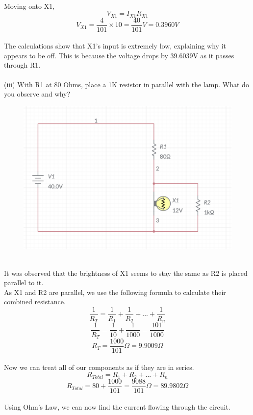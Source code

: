 \documentclass[12pt]{article}
\begin{document}
\\
Moving onto X1,\\
\[V_{X1} = I_{X1}R_{X1}\]
\[V_{X1} = \frac{4}{101} \times 10 = \frac{40}{101}V = 0.3960V\]\\
The calculations show that X1's input is extremely low, explaining why it appears to be off. This is because the voltage drops by 39.6039V as it passes through R1.\\
\\
(iii) With R1 at 80 Ohms, place a 1K resistor in parallel with the lamp. What do you observe and why?\\
\newpage
\begin{figure}[!h] 
	\begin{centering}
		\includegraphics[keepaspectratio = true, width = 5in]{Q2(iii).png}
	\end{centering}
\end{figure}\\
\noindent It was observed that the brightness of X1 seems to stay the same as R2 is placed parallel to it.
\\
As X1 and R2 are parallel, we use the following formula to calculate their combined resistance.\\
\[\frac{1}{R_T} = \frac{1}{R_1} + \frac{1}{R_2} + ... + \frac{1}{R_n}\]
\[\frac{1}{R_T} = \frac{1}{10} + \frac{1}{1000} = \frac{101}{1000}\]
\[R_T = \frac{1000}{101}\Omega = 9.9009\Omega \]\\
Now we can treat all of our components as if they are in series.\\
\[R_{Total} = R_1 + R_2 + ... + R_n\]
\[R_{Total} = 80 + \frac{1000}{101} = \frac{9088}{101}\Omega = 89.9802\Omega\]\\
Using Ohm's Law, we can now find the current flowing through the circuit.\\
\end{document}
